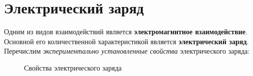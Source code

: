 \section{Электрический заряд}
    Одним из видов взаимодействий является \textbf{электромагнитное 
    взаимодействие}. Основной его количественной характеристикой является 
    \textbf{электрический заряд}. Перечислим \textit{экспериментально 
    установленные свойства} электрического заряда:
    \begin{figure}[h]
        \center
        \hfill
        \hfill
        \caption{Свойства электрического заряда}
    \end{figure}
